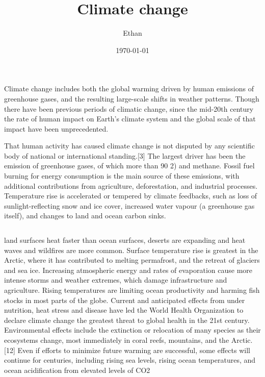 \documentclass[24pt,a0paper,portrait]{tikzposter}
\title{Climate change}
\author{Ethan}
\date{\today}
\institute{University of Oxford}
\begin{document}
\maketitle

\block{~}
{
    Climate change includes both the global warming driven by human emissions of greenhouse gases, and the resulting large-scale shifts in weather patterns. Though there have been previous periods of climatic change, since the mid-20th century the rate of human impact on Earth's climate system and the global scale of that impact have been unprecedented.

That human activity has caused climate change is not disputed by any scientific body of national or international standing.[3] The largest driver has been the emission of greenhouse gases, of which more than 90%
2) and methane. Fossil fuel burning for energy consumption is the main source of these emissions, with additional contributions from agriculture, deforestation, and industrial processes. Temperature rise is accelerated or tempered by climate feedbacks, such as loss of sunlight-reflecting snow and ice cover, increased water vapour (a greenhouse gas itself), and changes to land and ocean carbon sinks.
}

\begin{columns}
    { land surfaces heat faster than ocean surfaces, deserts are expanding and heat waves and wildfires are more common. Surface temperature rise is greatest in the Arctic, where it has contributed to melting permafrost, and the retreat of glaciers and sea ice. Increasing atmospheric energy and rates of evaporation cause more intense storms and weather extremes, which damage infrastructure and agriculture. Rising temperatures are limiting ocean productivity and harming fish stocks in most parts of the globe. Current and anticipated effects from under nutrition, heat stress and disease have led the World Health Organization to declare climate change the greatest threat to global health in the 21st century. Environmental effects include the extinction or relocation of many species as their ecosystems change, most immediately in coral reefs, mountains, and the Arctic.[12] Even if efforts to minimize future warming are successful, some effects will continue for centuries, including rising sea levels, rising ocean temperatures, and ocean acidification from elevated levels of CO2
    }
    
\end{columns}
\end{document}
